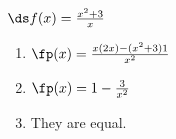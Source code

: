 {$\ds f(x)= \frac{x^2+3}{x}$
}
{\begin{enumerate}
\item		$\fp(x) = \frac{x(2x)-(x^2+3)1}{x^2}$
\item		$\fp(x) = 1-\frac{3}{x^2}$
\item		They are equal.
\end{enumerate}
}
